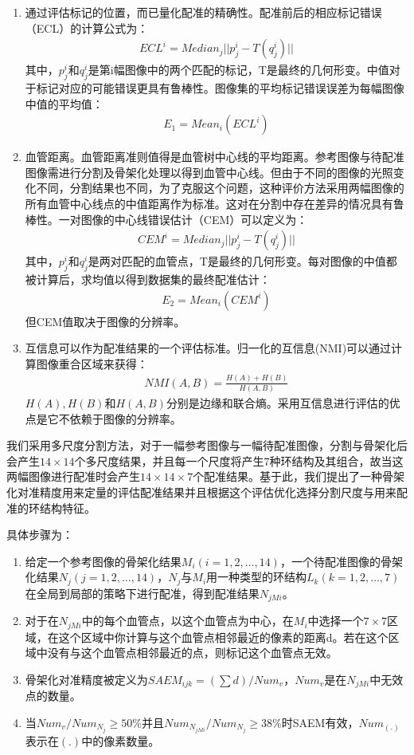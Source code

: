 \begin{enumerate}
\item 通过评估标记的位置，而已量化配准的精确性。配准前后的相应标记错误（ECL）的计算公式为：
\begin{align}
ECL^i = Median_{j}||p_j^i - T(q_j^i)|| 
\end{align}
其中，$p_j^i$和$q_j^i$是第i幅图像中的两个匹配的标记，T是最终的几何形变。中值对于标记对应的可能错误更具有鲁棒性。图像集的平均标记错误误差为每幅图像中值的平均值：
\begin{align}
E_1 = Mean_i(ECL^i)
\end{align}
\item 血管距离。血管距离准则值得是血管树中心线的平均距离。参考图像与待配准图像需进行分割及骨架化处理以得到血管中心线。但由于不同的图像的光照变化不同，分割结果也不同，为了克服这个问题，这种评价方法采用两幅图像的所有血管中心线点的中值距离作为标准。这对在分割中存在差异的情况具有鲁棒性。一对图像的中心线错误估计（CEM）可以定义为：
\begin{align}
CEM^i  = Median_j||p_j^i - T(q_j^i)||
\end{align}
其中，$p_j^i$和$q_j^i$是两对匹配的血管点，T是最终的几何形变。每对图像的中值都被计算后，求均值以得到数据集的最终配准估计：
\begin{align}
E_2 = Mean_i(CEM^i)
\end{align}
但CEM值取决于图像的分辨率。
\item 互信息可以作为配准结果的一个评估标准。归一化的互信息(NMI)可以通过计算图像重合区域来获得：
\begin{align}
NMI(A, B) = \frac{H(A)+H(B)}{H(A, B)}
\end{align}
$H(A), H(B)$和$H(A,B)$分别是边缘和联合熵。采用互信息进行评估的优点是它不依赖于图像的分辨率。
\end{enumerate}



我们采用多尺度分割方法，对于一幅参考图像与一幅待配准图像，分割与骨架化后会产生$14 \times 14$个多尺度结果，并且每一个尺度将产生7种环结构及其组合，故当这两幅图像进行配准时会产生$14 \times 14 \times 7$个配准结果。基于此，我们提出了一种骨架化对准精度用来定量的评估配准结果并且根据这个评估优化选择分割尺度与用来配准的环结构特征。

具体步骤为：
\begin{enumerate}
\item 给定一个参考图像的骨架化结果$M_i (i = 1, 2, \ldots, 14)$，一个待配准图像的骨架化结果$N_j (j = 1, 2, \ldots, 14)$，$N_j$与$M_i$用一种类型的环结构$L_k(k=1, 2, \ldots, 7)$在全局到局部的策略下进行配准，得到配准结果$N_{jMi}$。
\item 对于在$N_{jMi}$中的每个血管点，以这个血管点为中心，在$M_i$中选择一个$7 \times 7$区域，在这个区域中你计算与这个血管点相邻最近的像素的距离d。若在这个区域中没有与这个血管点相邻最近的点，则标记这个血管点无效。
\item 骨架化对准精度被定义为$SAEM_{ijk} = (\sum d) / Num_v$，$Num_v$是在$N_{jMi}$中无效点的数量。
\item 当$Num_v / Num_{N_j} \geq 50 \%$并且$Num_{N_{jMi}} / Num_{N_j} \geq 38 \%$时SAEM有效，$Num_{(.)}$表示在$(.)$中的像素数量。
\end{enumerate}

